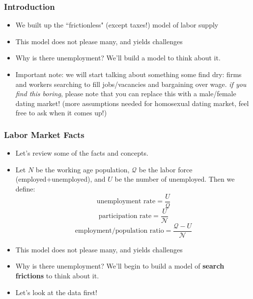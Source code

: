\documentclass{beamer}
\author{Trevor S. Gallen}
\date{}
\begin{document}
\renewcommand*{\inserttotalframenumber}{\pageref{lastframe}}



\begin{frame}
\titlepage
\end{frame}

\begin{frame}
\frametitle[alignment=center]{Introduction}
\begin{itemize}
\item We built up the ``frictionless" (except taxes!) model of labor supply
\bigskip
\item This model does not please many, and yields challenges  
\bigskip
\item Why is there unemployment?  We'll build a model to think about it.
\bigskip
\item Important note: we will start talking about something some find dry:  firms and workers searching to fill jobs/vacancies and bargaining over wage.  \emph{if you find this boring}, please note that you can replace this with a male/female dating market! (more assumptions needed for homosexual dating market, feel free to ask when it comes up!)
\end{itemize}
\end{frame}

\begin{frame}
\frametitle[alignment=center]{Labor Market Facts}
\begin{itemize}
\item Let's review some of the facts and concepts.
\bigskip
\item Let $N$ be the working age population, $\mathcal{Q}$ be the labor force (employed+unemployed), and $U$ be the number of unemployed.  Then we define:
$$\text{unemployment rate}=\frac{U}{\mathcal{Q}}$$
$$\text{participation rate}=\frac{U}{\mathcal{N}}$$
$$\text{employment/population ratio}=\frac{\mathcal{Q}-U}{\mathcal{N}}$$
\bigskip
\item This model does not please many, and yields challenges  
\bigskip
\item Why is there unemployment?  We'll begin to build a model of \textbf{search frictions} to think about it.
\bigskip
\item Let's look at the data first!
\end{itemize}
\end{frame}
\end{document}

